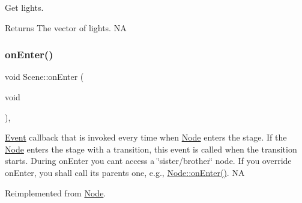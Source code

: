 Get lights. \begin{DoxyReturn}{Returns}
The vector of lights.  NA 
\end{DoxyReturn}
\mbox{\label{classScene_a0f685cac49f90456c69f1b03aa5c8674}} 
\subsubsection{\texorpdfstring{on\+Enter()}{onEnter()}}
{\footnotesize\ttfamily void Scene\+::on\+Enter (\begin{DoxyParamCaption}\item[{void}]{ }\end{DoxyParamCaption})\hspace{0.3cm}{\ttfamily [override]}, {\ttfamily [virtual]}}

\hyperlink{classEvent}{Event} callback that is invoked every time when \hyperlink{classNode}{Node} enters the \textquotesingle{}stage\textquotesingle{}. If the \hyperlink{classNode}{Node} enters the \textquotesingle{}stage\textquotesingle{} with a transition, this event is called when the transition starts. During on\+Enter you can\textquotesingle{}t access a \char`\"{}sister/brother\char`\"{} node. If you override on\+Enter, you shall call its parent\textquotesingle{}s one, e.\+g., \hyperlink{classNode_a7f51764c4afd5018a052b9ef71c03374}{Node\+::on\+Enter()}.  NA 

Reimplemented from \hyperlink{classNode_a7f51764c4afd5018a052b9ef71c03374}{Node}.



